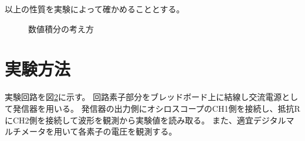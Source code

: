 \documentclass[11pt,a4paper,fleqn]{jsarticle}
\begin{document}
以上の性質を実験によって確かめることとする。
\begin{figure}[htbp]
 \centering
 \caption{数値積分の考え方}
 \label{fig:6}
\end{figure}
%
\section{実験方法}

実験回路を図\ref{fig:3}に示す。
回路素子部分をブレッドボード上に結線し交流電源として発信器を用いる。
発信器の出力側にオシロスコープのCH1側を接続し、抵抗RにCH2側を接続して波形を観測から実験値を読み取る。
また、適宜デジタルマルチメータを用いて各素子の電圧を観測する。
\begin{figure}[h]
\label{fig:3}
\end{figure}
\end{document}
